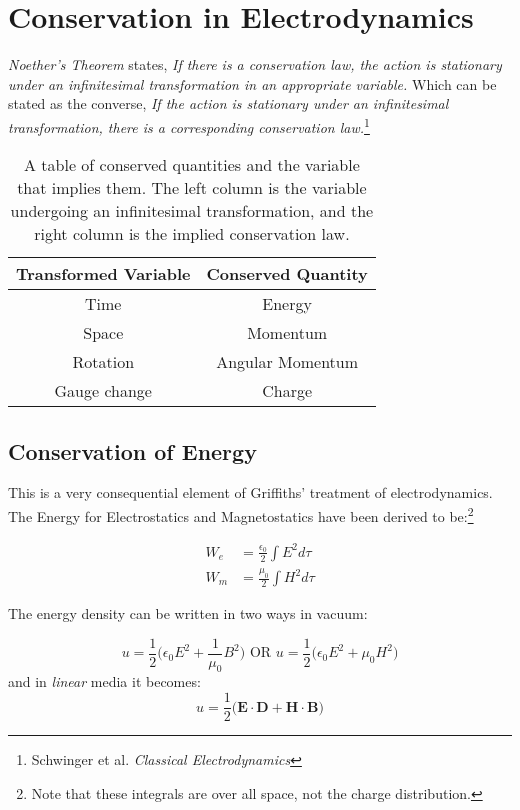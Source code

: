 
\section{Conservation in Electrodynamics}

\emph{Noether's Theorem} states, \emph{If there is a conservation law, the action is stationary under an infinitesimal transformation in an appropriate variable.} Which can be stated as the converse, \emph{If the action is stationary under an infinitesimal transformation, there is a corresponding conservation law.}\footnote{Schwinger et al. \emph{Classical Electrodynamics}}

\begin{table}[!hbtp]
    \centering
    \begin{tabular}{c c}
        \toprule
        Transformed Variable  &  Conserved Quantity \\
        \toprule
        Time                  &  Energy             \\
        Space                 &  Momentum           \\
        Rotation              &  Angular Momentum   \\
        Gauge change          &  Charge             \\
    \end{tabular}
    \caption{A table of conserved quantities and the variable that implies them. The left column is the variable undergoing an infinitesimal transformation, and the right column is the implied conservation law.}
    \label{tab:conserve}
\end{table}



\subsection{Conservation of Energy}
This is a very consequential element of Griffiths' treatment of electrodynamics. The Energy for Electrostatics and Magnetostatics have been derived to be:\footnote{Note that these integrals are over all space, not the charge distribution.}

\begin{align*}
    W_e &= \frac{\epsilon_0}{2} \int E^2 d\tau \\
    W_m &= \frac{\mu_0}{2} \int H^2 d\tau
\end{align*}

The energy density can be written in two ways in vacuum:

\[
u = \frac{1}{2} \Big( \epsilon_0 E^2 + \frac{1}{\mu_0} B^2 \Big)  \text{    OR    } u = \frac{1}{2} \Big( \epsilon_0 E^2 + \mu_0 H^2 \Big)
\]
and in \emph{linear} media it becomes:
\[
u = \frac{1}{2} \Big( \textbf{E} \cdot \textbf{D} + \textbf{H} \cdot \textbf{B} \Big)
\]